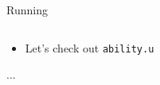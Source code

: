 \documentclass[hyperref={pdfpagelabels=false},12pt]{beamer}
\newcommand{\code}[2]{\texttt{#2}}
\newcommand{\bash}[1]{\code{bash}{#1}}
\newcommand{\pygmentLines}[5]{\inputminted[bgcolor=lightgray,linenos,fontsize=#1,firstline=#2,lastline=#3,autogobble]{#4}{#5}}
\begin{document}
\begin{frame}{Running}
  \pygmentLines{\footnotesize}{2}{4}{text}{code/ability.u}
  \begin{itemize}
    \item Let's check out \bash{ability.u}
  \end{itemize}
\end{frame}

\begin{frame}{...}
\end{frame}
\end{document}
